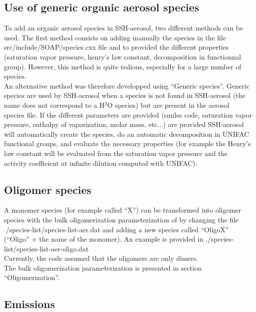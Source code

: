 \documentclass[a4paper,11pt]{article}
\begin{document}
\subsection{Use of generic organic aerosol species}

To add an organic aerosol species in SSH-aerosol, two different methods can be used. The first method consists on adding manually the species in the file src/include/SOAP/species.cxx file and to provided the different properties (saturation vapor pressure, henry's law constant, decomposition in functionnal group). However, this method is quite tedious, especially for a large number of species.\\
An alternative method was therefore developped using ``Generic species''. Generic species are used by SSH-aerosol when a species is not found in SSH-aerosol (the name does not correspond to a H$^2$O species) but are present in the aerosol species file. If the different parameters are provided (smiles code, saturation vapor pressure, enthalpy of vaporization, molar mass, etc...) are provided SSH-aerosol will automatically create the species, do an automatic decomposition in UNIFAC functional groups, and evaluate the necessary properties (for example the Henry's law constant will be evaluated from the saturation vapor pressure and the activity coefficient at infinite dilution computed with UNIFAC).\\   

\subsection{Oligomer species}

A monomer species (for example called ``X'') can be transformed into oligomer species with the bulk oligomerization parameterization of \cite{couvidat2018} by changing the file ./species-list/species-list-aer.dat and adding a new species called ``OligoX'' (``Oligo'' + the name of the monomer). An example is provided in ./species-list/species-list-aer-oligo.dat\\
Currently, the code assumed that the oligomers are only dimers.\\
The bulk oligomerization parameterization is presented in section ``Oligomerization''.\\


\subsection{Emissions}
\end{document}
